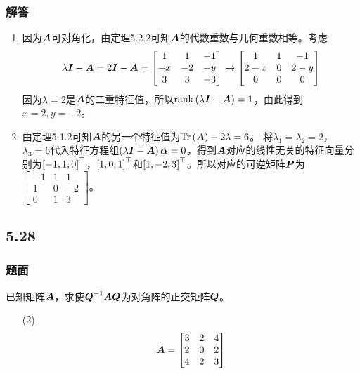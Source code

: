 \documentclass{beamer}
\begin{document}
\begin{frame}
    \frametitle{解答}
    \begin{enumerate}
        \item {
              因为\(\boldsymbol{A}\)可对角化，由定理5.2.2可知\(\boldsymbol{A}\)的代数重数与几何重数相等。考虑
              \begin{equation*}
                  \lambda\boldsymbol{I}-\boldsymbol{A}=2\boldsymbol{I}-\boldsymbol{A}=
                  \begin{bmatrix}
                      1  & 1  & -1 \\
                      -x & -2 & -y \\
                      3  & 3  & -3
                  \end{bmatrix}\to
                  \begin{bmatrix}
                      1   & 1 & -1  \\
                      2-x & 0 & 2-y \\
                      0   & 0 & 0
                  \end{bmatrix}
              \end{equation*}
              因为\(\lambda=2\)是\(\boldsymbol{A}\)的二重特征值，所以\(\mathrm{rank}\left( \lambda\boldsymbol{I}-\boldsymbol{A} \right)=1\)，由此得到\(x=2,y=-2\)。
              }\pause
        \item {
              由定理5.1.2可知\(\boldsymbol{A}\)的另一个特征值为\(\mathrm{Tr}\left( \boldsymbol{A} \right)-2\lambda=6\)。
              将\(\lambda_1=\lambda_2=2\)，\(\lambda_3=6\)代入特征方程组\(\left( \lambda\boldsymbol{I}-\boldsymbol{A} \right)\boldsymbol{\alpha}=0\)，得到\(\boldsymbol{A}\)对应的线性无关的特征向量分别为\(\left[ -1,1,0 \right]^\top\)，\(\left[ 1,0,1 \right]^\top\)和\(\left[ 1,-2,3 \right]^\top\)。所以对应的可逆矩阵\(\boldsymbol{P}\)为\(\begin{bmatrix}-1&1&1\\1&0&-2\\0&1&3\end{bmatrix}\)。
              }
    \end{enumerate}
\end{frame}

\subsection*{5.28}
\begin{frame}
    \frametitle{题面}
    已知矩阵\(\boldsymbol{A}\)，求使\({\boldsymbol{Q}}^{-1}\boldsymbol{A}\boldsymbol{Q}\)为对角阵的正交矩阵\(\boldsymbol{Q}\)。
    \begin{enumerate}
        \item[(2)]
              {
              \begin{equation*}
                  \boldsymbol{A}=
                  \begin{bmatrix}
                      3 & 2 & 4 \\
                      2 & 0 & 2 \\
                      4 & 2 & 3
                  \end{bmatrix}
              \end{equation*}
              }
    \end{enumerate}
\end{frame}
\end{document}
